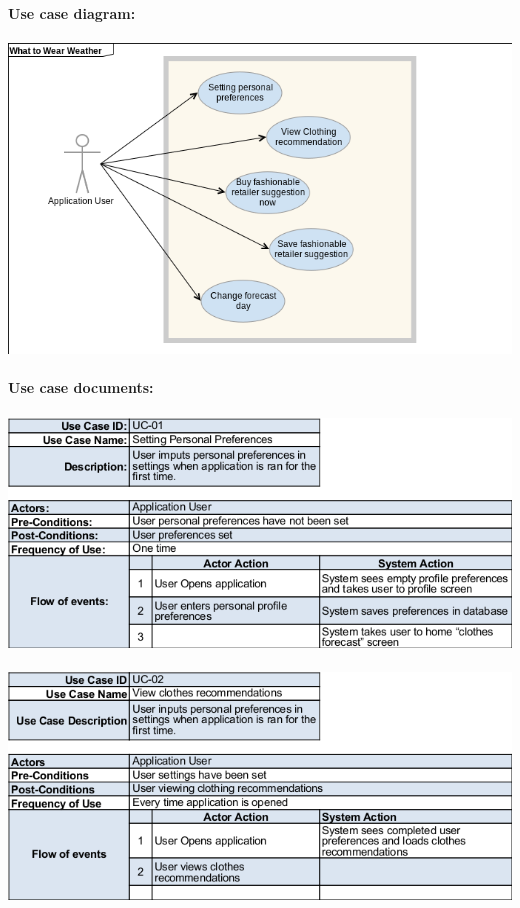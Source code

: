 \documentclass[12pt,a4paper]{article}
\begin{document}
\pagebreak

\noindent\textbf{Use case diagram:} \\\\
\includegraphics[scale=0.6]{usecasediagram.png} \\\\
\noindent\textbf{Use case documents:} \\\\
\includegraphics[scale=0.7]{usecase1.png} \\\\
\includegraphics[scale=0.7]{usecase2.png} \\\\
\end{document}
